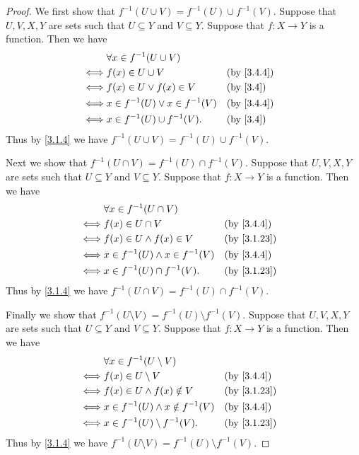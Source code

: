 \begin{proof}
  We first show that \(f^{-1}(U \cup V) = f^{-1}(U) \cup f^{-1}(V)\).
  Suppose that \(U, V, X, Y\) are sets such that \(U \subseteq Y\) and \(V \subseteq Y\).
  Suppose that \(f : X \to Y\) is a function.
  Then we have
  \begin{align*}
         & \forall x \in f^{-1}(U \cup V)                       \\
    \iff & f(x) \in U \cup V                    &  & \by{3.4.4} \\
    \iff & f(x) \in U \lor f(x) \in V           &  & \by{3.4}   \\
    \iff & x \in f^{-1}(U) \lor x \in f^{-1}(V) &  & \by{3.4.4} \\
    \iff & x \in f^{-1}(U) \cup f^{-1}(V).      &  & \by{3.4}
  \end{align*}
  Thus by \cref{3.1.4} we have \(f^{-1}(U \cup V) = f^{-1}(U) \cup f^{-1}(V)\).

  Next we show that \(f^{-1}(U \cap V) = f^{-1}(U) \cap f^{-1}(V)\).
  Suppose that \(U, V, X, Y\) are sets such that \(U \subseteq Y\) and \(V \subseteq Y\).
  Suppose that \(f : X \to Y\) is a function.
  Then we have
  \begin{align*}
         & \forall x \in f^{-1}(U \cap V)                         \\
    \iff & f(x) \in U \cap V                     &  & \by{3.4.4}  \\
    \iff & f(x) \in U \land f(x) \in V           &  & \by{3.1.23} \\
    \iff & x \in f^{-1}(U) \land x \in f^{-1}(V) &  & \by{3.4.4}  \\
    \iff & x \in f^{-1}(U) \cap f^{-1}(V).       &  & \by{3.1.23}
  \end{align*}
  Thus by \cref{3.1.4} we have \(f^{-1}(U \cap V) = f^{-1}(U) \cap f^{-1}(V)\).

  Finally we show that \(f^{-1}(U \setminus V) = f^{-1}(U) \setminus f^{-1}(V)\).
  Suppose that \(U, V, X, Y\) are sets such that \(U \subseteq Y\) and \(V \subseteq Y\).
  Suppose that \(f : X \to Y\) is a function.
  Then we have
  \begin{align*}
         & \forall x \in f^{-1}(U \setminus V)                       \\
    \iff & f(x) \in U \setminus V                   &  & \by{3.4.4}  \\
    \iff & f(x) \in U \land f(x) \notin V           &  & \by{3.1.23} \\
    \iff & x \in f^{-1}(U) \land x \notin f^{-1}(V) &  & \by{3.4.4}  \\
    \iff & x \in f^{-1}(U) \setminus f^{-1}(V).     &  & \by{3.1.23}
  \end{align*}
  Thus by \cref{3.1.4} we have \(f^{-1}(U \setminus V) = f^{-1}(U) \setminus f^{-1}(V)\).
\end{proof}


